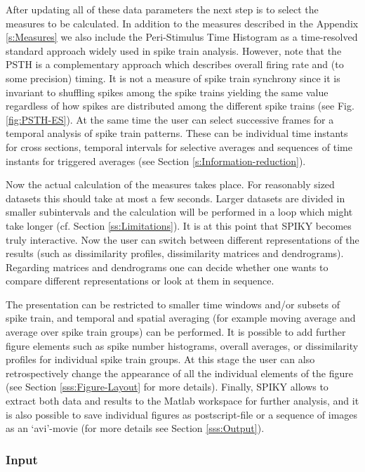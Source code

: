 \documentclass[10pt,twocolumn]{elsart5p}
\begin{document}
After updating all of these data parameters the next step is to select the measures to be calculated. In addition to the measures described in the Appendix \ref{s:Measures} we also include the Peri-Stimulus Time Histogram as a time-resolved standard approach widely used in spike train analysis. However, note that the PSTH is a complementary approach which describes overall firing rate and (to some precision) timing. It is not a measure of spike train synchrony \citep{Kreuz11} since it is invariant to shuffling spikes among the spike trains yielding the same value regardless of how spikes are distributed among the different spike trains (see Fig. \ref{fig:PSTH-ES}). At the same time the user can select successive frames for a temporal analysis of spike train patterns. These can be individual time instants for cross sections, temporal intervals for selective averages and sequences of time instants for triggered averages (see Section \ref{s:Information-reduction}).

Now the actual calculation of the measures takes place. For reasonably sized datasets this should take at most a few seconds. Larger datasets are divided in smaller subintervals and the calculation will be performed in a loop which might take longer (cf. Section \ref{ss:Limitations}). It is at this point that SPIKY becomes truly interactive. Now the user can switch between different representations of the results (such as dissimilarity profiles, dissimilarity matrices and dendrograms). Regarding matrices and dendrograms one can decide whether one wants to compare different representations or look at them in sequence.

The presentation can be restricted to smaller time windows and/or subsets of spike train, and temporal and spatial averaging (for example moving average and average over spike train groups) can be performed. It is possible to add further figure elements such as spike number histograms, overall averages, or dissimilarity profiles for individual spike train groups. At this stage the user can also retrospectively change the appearance of all the individual elements of the figure (see Section \ref{sss:Figure-Layout} for more details). Finally, SPIKY allows to extract both data and results to the Matlab workspace for further analysis, and it is also possible to save individual figures as postscript-file or a sequence of images as an `avi'-movie (for more details see Section \ref{sss:Output}).


\subsubsection{\label{sss:Input} Input}
\end{document}
